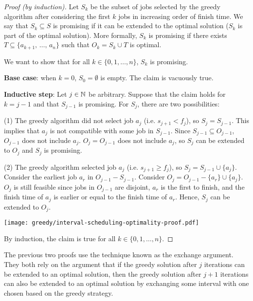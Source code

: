 \begin{proof}[Proof (by induction)]
    Let $S_k$ be the subset of jobs selected by the greedy algorithm after considering the first $k$ jobs in increasing order of finish time. We say that $S_k \subseteq S$ is promising if it can be extended to the optimal solution ($S_k$ is part of the optimal solution). More formally, $S_k$ is promising if there exists $T \subseteq \{ a_{k+1},\, \ldots,\, a_{n}\}$ such that $O_k = S_k \cup T$ is optimal.

    We want to show that for all $k \in \{0,1,\ldots,n\}$, $S_k$ is promising.

    \textbf{Base case}: when $k=0$, $S_0=\emptyset$ is empty. The claim is vacuously true.
    
    \textbf{Inductive step}: Let $j \in \mathbb{N}$ be arbitrary. Suppose that the claim holds for $k = j - 1$ and that $S_{j-1}$ is promising. For $S_j$, there are two possibilities:

    (1) The greedy algorithm did not select job $a_j$ (i.e. $s_{j+1} < f_j$), so $S_j = S_{j-1}$. This implies that $a_j$ is not compatible with some job in $S_{j-1}$. Since $S_{j-1} \subseteq O_{j-1}$, $O_{j-1}$ does not include $a_j$. $O_j = O_{j-1}$ does not include $a_j$, so $S_j$ can be extended to $O_j$ and $S_j$ is promising.
    
    (2) The greedy algorithm selected job $a_j$ (i.e. $s_{j+1} \geq f_j$), so $S_j = S_{j-1} \cup \{a_j\}$. Consider the earliest job $a_r$ in $O_{j-1} - S_{j-1}$. Consider $O_j = O_{j-1} - \{a_r\} \cup \{a_j\}$. $O_j$ is still feasible since jobs in $O_{j-1}$ are disjoint, $a_r$ is the first to finish, and the finish time of $a_j$ is earlier or equal to the finish time of $a_r$. Hence, $S_j$ can be extended to $O_j$.

    \begin{center}
        \texttt{[image: greedy/interval-scheduling-optimality-proof.pdf]}
    \end{center}
    By induction, the claim is true for all $k \in \{0,1,\ldots,n\}$.
\end{proof}

The previous two proofs use the technique known as the exchange argument. They both rely on the argument that if the greedy solution after $j$ iterations can be extended to an optimal solution, then the greedy solution after $j+1$ iterations can also be extended to an optimal solution by exchanging some interval with one chosen based on the greedy strategy. 

